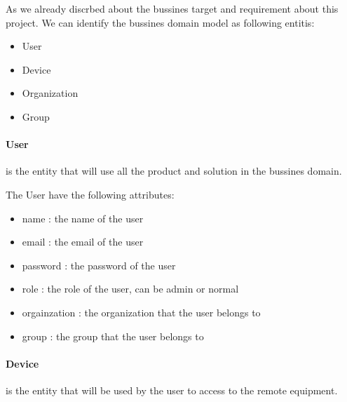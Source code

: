 


As we already discrbed about the bussines target and requirement 
about this project. We can identify the bussines domain model as following
entitis:

\begin{itemize}
    \item User
    \item Device
    \item Organization
    \item Group
\end{itemize}

\paragraph{User} is the entity that will use all the product and solution 
in the bussines domain. 

The User have the following attributes:

\begin{itemize}
    \item name : the name of the user
    \item email : the email of the user
    \item password : the password of the user
    \item role : the role of the user, can be admin or normal
    \item orgainzation : the organization that the user belongs to
    \item group : the group that the user belongs to
\end{itemize}

\paragraph{Device} is the entity that will be used by the user to access 
to the remote equipment.

